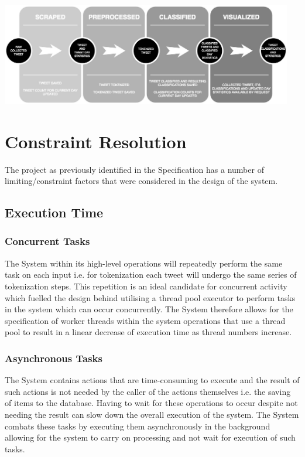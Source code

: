 \documentclass[11pt]{report}
\begin{document}
\begin{center}
  \includegraphics[width=12.75cm]{images/syspipe.jpg}
  \label{fig:syspipe}
\end{center}

\section{Constraint Resolution}

The project as previously identified in the Specification has a number of limiting/constraint factors that were considered in the design of the system. 

\subsection*{Execution Time} 

\subsubsection*{Concurrent Tasks}
The System within its high-level operations will repeatedly perform the same task on each input i.e. for tokenization each tweet will undergo the same series of tokenization steps. This repetition is an ideal candidate for concurrent activity which fuelled the design behind utilising a thread pool executor to perform tasks in the system which can occur concurrently. The System therefore allows for the specification of worker threads within the system operations that use a thread pool to result in a linear decrease of execution time as thread numbers increase.

\subsubsection*{Asynchronous Tasks}
The System contains actions that are time-consuming to execute and the result of such actions is not needed by the caller of the actions themselves i.e. the saving of items to the database. Having to wait for these operations to occur despite not needing the result can slow down the overall execution of the system. The System combats these tasks by executing them asynchronously in the background allowing for the system to carry on processing and not wait for execution of such tasks.
\end{document}
